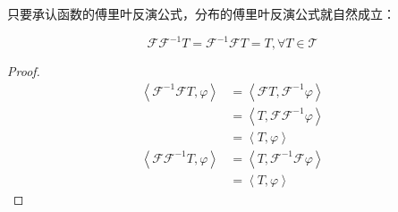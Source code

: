只要承认函数的傅里叶反演公式，分布的傅里叶反演公式就自然成立：\begin{theorem}[分布的傅里叶反演公式]
    \[\mathcal{F} \mathcal{F} ^{-1}T=\mathcal{F} ^{-1}\mathcal{F} T=T,\forall T\in\mathcal{T}\]
\end{theorem}
\begin{proof}
    \begin{align*}
    \left\langle \mathcal{F} ^{-1}\mathcal{F} T,\varphi\right\rangle & =\left\langle \mathcal{F} T,\mathcal{F} ^{-1}\varphi\right\rangle \\
                                                          & =\left\langle T,\mathcal{F} \mathcal{F} ^{-1}\varphi\right\rangle \\
                                                          & =\left\langle T,\varphi\right\rangle                              \\
    \left\langle \mathcal{F} \mathcal{F} ^{-1}T,\varphi\right\rangle & =\left\langle T,\mathcal{F} ^{-1}\mathcal{F} \varphi\right\rangle \\
                                                          & =\left\langle T,\varphi\right\rangle
\end{align*}
\end{proof}

